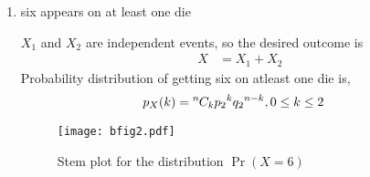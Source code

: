 \documentclass{article}
\providecommand{\pr}[1]{\ensuremath{\Pr\left(#1\right)}}
\newcommand*{\permcomb}[4][0mu]{{{}^{#3}\mkern#1#2_{#4}}}
\newcommand*{\comb}[1][-1mu]{\permcomb[#1]{C}}
\providecommand{\pr}[1]{\ensuremath{\Pr\left(#1\right)}}
\begin{document}
\begin{enumerate}[label=13.\arabic{enumi}.\arabic{enumii}]
\begin{enumerate}
\item six appears on at least one die

$X_1$ and $X_2$ are independent events, so the desired outcome is
\begin{align}
X&=X_1+X_2
\end{align}
Probability distribution of getting six on atleast one die is,
\begin{align}
p_X(k)   &= \comb{n}{k}{p_2}^{k}{q_2}^{n-k}, 0 \le k \le 2
\end{align}

\begin{figure}
\centering
\texttt{[image: bfig2.pdf]}
\caption{Stem plot for the distribution $\pr{X=6}$}
\label{fig:Plot}
\end{figure}
\end{enumerate}
\end{enumerate}
\end{document}
